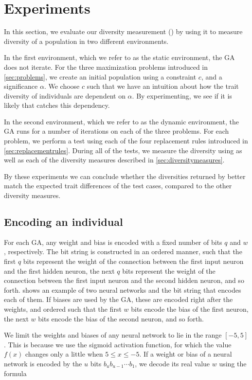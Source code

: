 \section{Experiments}\label{sec:experiments}
In this section, we evaluate our diversity measurement (\dia) by using it to measure diversity of a population in two different environments.

In the first environment, which we refer to as the static environment, the GA does not iterate.
For the three maximization problems introduced in \cref{sec:problems}, we create an initial population using a constraint $c$, and a significance $\alpha$. We choose $c$ such that we have an intuition about how the trait diversity of individuals are dependent on $\alpha$. By experimenting, we see if it is likely that \dia{} catches this dependency.

In the second environment, which we refer to as the dynamic environment, the GA runs for a number of iterations on each of the three problems. 
For each problem, we perform a test using each of the four replacement rules introduced in \cref{sec:replacementrules}.
During all of the tests, we measure the diversity using \dia{} as well as each of the diversity measures described in \cref{sec:diversitymeasures}.

By these experiments we can conclude whether the diversities returned by \dia{} better match the expected trait differences of the test cases, compared to the other diversity measures.

\subsection{Encoding an individual}
For each GA, any weight and bias is encoded with a fixed number of bits $q$ and $w$, respectively. The bit string is constructed in an ordered manner, such that the first $q$ bits represent the weight of the connection between the first input neuron and the first hidden neuron, the next $q$ bits represent the weight of the connection between the first input neuron and the second hidden neuron, and so forth.  shows an example of two neural networks and the bit string that encodes each of them. If biases are used by the GA, these are encoded right after the weights, and ordered such that the first $w$ bits encode the bias of the first neuron, the next $w$ bits encode the bias of the second neuron, and so forth. 

We limit the weights and biases of any neural network to lie in the range $[-5,5]$.
This is because we use the sigmoid activation function, for which the value $f(x)$ changes only a little when $5 \leq x \leq -5$. If a weight or bias of a neural network is encoded by the $u$ bits $b_u b_{u-1} \cdots b_1$, we decode its real value $w$ using the formula

